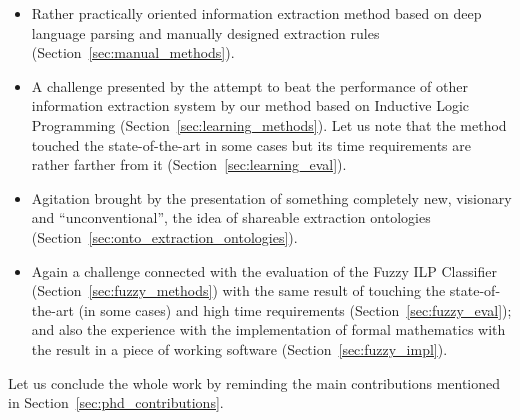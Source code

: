 \begin{itemize}
	\item Rather practically oriented information extraction method based on deep language parsing and manually designed extraction rules (Section~\ref{sec:manual_methods}).

	\item A challenge presented by the attempt to beat the performance of other information extraction system by our method based on Inductive Logic Programming (Section~\ref{sec:learning_methods}).  Let us note that the method touched the state-of-the-art in some cases but its time requirements are rather farther from it (Section~\ref{sec:learning_eval}).

	\item Agitation brought by the presentation of something completely new, visionary and ``unconventional'', the idea of shareable extraction ontologies (Section~\ref{sec:onto_extraction_ontologies}).

	\item Again a challenge connected with the evaluation of the Fuzzy ILP Classifier (Section~\ref{sec:fuzzy_methods}) with the same result of touching the state-of-the-art (in some cases) and high time requirements (Section~\ref{sec:fuzzy_eval}); and also the experience with the implementation of formal mathematics with the result in a piece of working software (Section~\ref{sec:fuzzy_impl}).
\end{itemize}

Let us conclude the whole work by reminding the main contributions mentioned in Section~\ref{sec:phd_contributions}.
